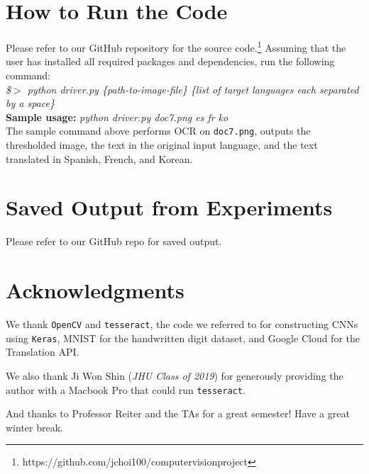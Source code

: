 \documentclass[11pt,letterpaper]{article}
\begin{document}
\section*{How to Run the Code}

Please refer to our GitHub repository for the source code.\footnote{https://github.com/jchoi100/computer\textunderscore vision\textunderscore project} Assuming that the user has installed all required packages and dependencies, run the following command:\\

\textit{\$$>$ python driver.py \{path-to-image-file\} \{list of target languages each separated by a space\}}\\

\textbf{Sample usage:} \textit{python driver.py doc7.png es fr ko}\\

The sample command above performs OCR on {\tt doc7.png}, outputs the thresholded image, the text in the original input language, and the text translated in Spanish, French, and Korean.

\section*{Saved Output from Experiments}

Please refer to our GitHub repo for saved output.

\section*{Acknowledgments}

We thank {\tt OpenCV} and {\tt tesseract}, the code we referred to for constructing CNNs using {\tt Keras},  MNIST for the handwritten digit dataset, and Google Cloud for the Translation API.

We also thank Ji Won Shin (\textit{JHU Class of 2019}) for generously providing the author with a Macbook Pro that could run {\tt tesseract}.

And thanks to Professor Reiter and the TAs for a great semester! Have a great winter break.
\end{document}
